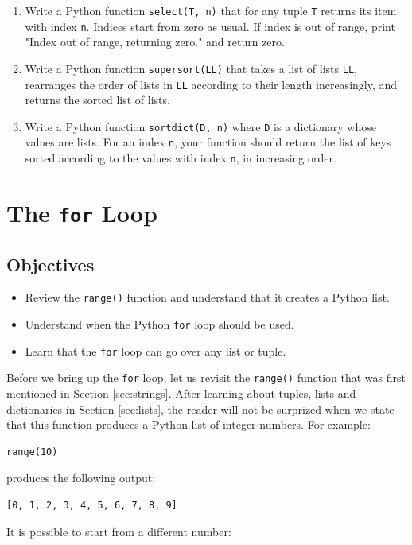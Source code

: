 \begin{enumerate}
\item Write a Python function {\tt select(T, n)} that for any tuple {\tt T}
      returns its item with index {\tt n}. Indices start from zero as usual.
      If index is out of range, print "Index out of range, returning zero." and 
      return zero.
\item Write a Python function {\tt supersort(LL)} that takes a list of lists {\tt LL}, 
      rearranges the order of lists in {\tt LL} according to their length increasingly,
      and returns the sorted list of lists. 
\item Write a Python function {\tt sortdict(D, n)} where {\tt D} is a dictionary whose values 
      are lists. For an index {\tt n}, your function should return the list of keys sorted 
      according to the values with index {\tt n}, in increasing order. 
\end{enumerate}

\section{The {\tt for} Loop} \label{sec:forloop}

\subsection{Objectives}

\begin{itemize}
\item Review the {\tt range()} function and understand that it creates a Python list.
\item Understand when the Python {\tt for} loop should be used.
\item Learn that the {\tt for} loop can go over any list or tuple.
\end{itemize}
Before we bring up the {\tt for} loop, let us revisit the {\tt range()}
function that was first mentioned in Section \ref{sec:strings}. After 
learning about tuples, lists and dictionaries in Section \ref{sec:lists}, the 
reader will not be surprized when we state that this function produces 
a Python list of integer numbers. For example:

\begin{verbatim}
range(10)
\end{verbatim}
produces the following output:

\begin{verbatim}
[0, 1, 2, 3, 4, 5, 6, 7, 8, 9]
\end{verbatim}
It is possible to start from a different number:

